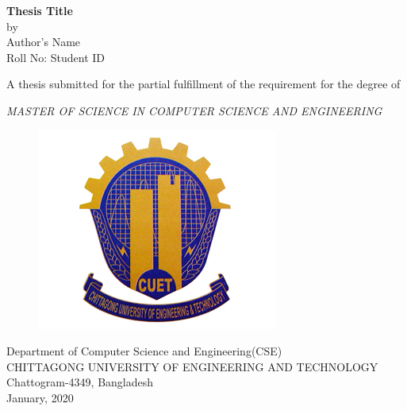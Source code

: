 \begin{titlepage}
\vspace*{\fill}
\begin{center}

\textbf{\LARGE Thesis Title}
\\[ 0.5 in]
by\\ [0.1in] \textcolor{astral}{Author's Name\\ [0.05in] Roll No: Student ID}
\\[1 in]
\end{center}
\begin{center}
   A thesis submitted for the partial fulfillment of the requirement for the degree of 

\textit{MASTER OF SCIENCE IN COMPUTER SCIENCE AND ENGINEERING} 
\end{center}
\begin{figure}[ht]
\centering
\includegraphics[width=2 in]{figures/logo.jpg}
\centering
\end{figure} 
\begin{center}
\large{Department of Computer Science and Engineering(CSE)}
\\[0.05in]
CHITTAGONG UNIVERSITY OF ENGINEERING AND TECHNOLOGY
\\[0.05in]
Chattogram-4349, Bangladesh
\\[0.05in]
January, 2020
\end{center}
\vspace*{\fill}

\end{titlepage}
